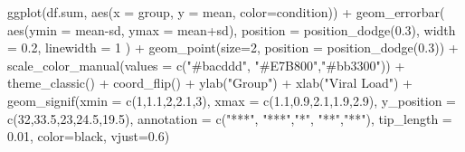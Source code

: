 \documentclass[
  letterpaper,
  DIV=11,
  numbers=noendperiod]{scrreprt}
\newenvironment{Shaded}{\begin{snugshade}}{\end{snugshade}}
\newcommand{\AttributeTok}[1]{\textcolor[rgb]{0.40,0.45,0.13}{#1}}
\newcommand{\DecValTok}[1]{\textcolor[rgb]{0.68,0.00,0.00}{#1}}
\newcommand{\FloatTok}[1]{\textcolor[rgb]{0.68,0.00,0.00}{#1}}
\newcommand{\FunctionTok}[1]{\textcolor[rgb]{0.28,0.35,0.67}{#1}}
\newcommand{\NormalTok}[1]{\textcolor[rgb]{0.00,0.23,0.31}{#1}}
\newcommand{\SpecialCharTok}[1]{\textcolor[rgb]{0.37,0.37,0.37}{#1}}
\newcommand{\StringTok}[1]{\textcolor[rgb]{0.13,0.47,0.30}{#1}}
\begin{document}
\begin{Shaded}
\begin{Highlighting}[]
\FunctionTok{ggplot}\NormalTok{(df.sum, }\FunctionTok{aes}\NormalTok{(}\AttributeTok{x =}\NormalTok{ group, }\AttributeTok{y =}\NormalTok{ mean, }\AttributeTok{color=}\NormalTok{condition)) }\SpecialCharTok{+}
  \FunctionTok{geom\_errorbar}\NormalTok{(}
    \FunctionTok{aes}\NormalTok{(}\AttributeTok{ymin =}\NormalTok{ mean}\SpecialCharTok{{-}}\NormalTok{sd, }
        \AttributeTok{ymax =}\NormalTok{ mean}\SpecialCharTok{+}\NormalTok{sd),}
    \AttributeTok{position =} \FunctionTok{position\_dodge}\NormalTok{(}\FloatTok{0.3}\NormalTok{), }
    \AttributeTok{width =} \FloatTok{0.2}\NormalTok{,}
    \AttributeTok{linewidth =} \DecValTok{1}
\NormalTok{  ) }\SpecialCharTok{+}
  \FunctionTok{geom\_point}\NormalTok{(}\AttributeTok{size=}\DecValTok{2}\NormalTok{,}
             \AttributeTok{position =} \FunctionTok{position\_dodge}\NormalTok{(}\FloatTok{0.3}\NormalTok{)) }\SpecialCharTok{+}
  \FunctionTok{scale\_color\_manual}\NormalTok{(}\AttributeTok{values =} \FunctionTok{c}\NormalTok{(}\StringTok{"\#bacddd"}\NormalTok{, }\StringTok{"\#E7B800"}\NormalTok{,}\StringTok{"\#bb3300"}\NormalTok{)) }\SpecialCharTok{+}
  \FunctionTok{theme\_classic}\NormalTok{() }\SpecialCharTok{+}
  \FunctionTok{coord\_flip}\NormalTok{() }\SpecialCharTok{+}
  \FunctionTok{ylab}\NormalTok{(}\StringTok{"Group"}\NormalTok{) }\SpecialCharTok{+}
  \FunctionTok{xlab}\NormalTok{(}\StringTok{"Viral Load"}\NormalTok{) }\SpecialCharTok{+}
  \FunctionTok{geom\_signif}\NormalTok{(}\AttributeTok{xmin =} \FunctionTok{c}\NormalTok{(}\DecValTok{1}\NormalTok{,}\FloatTok{1.1}\NormalTok{,}\DecValTok{2}\NormalTok{,}\FloatTok{2.1}\NormalTok{,}\DecValTok{3}\NormalTok{),}
              \AttributeTok{xmax =} \FunctionTok{c}\NormalTok{(}\FloatTok{1.1}\NormalTok{,}\FloatTok{0.9}\NormalTok{,}\FloatTok{2.1}\NormalTok{,}\FloatTok{1.9}\NormalTok{,}\FloatTok{2.9}\NormalTok{),}
              \AttributeTok{y\_position =} \FunctionTok{c}\NormalTok{(}\DecValTok{32}\NormalTok{,}\FloatTok{33.5}\NormalTok{,}\DecValTok{23}\NormalTok{,}\FloatTok{24.5}\NormalTok{,}\FloatTok{19.5}\NormalTok{),}
              \AttributeTok{annotation =} \FunctionTok{c}\NormalTok{(}\StringTok{"***"}\NormalTok{, }\StringTok{"***"}\NormalTok{,}\StringTok{"*"}\NormalTok{, }\StringTok{"**"}\NormalTok{,}\StringTok{"**"}\NormalTok{),}
              \AttributeTok{tip\_length =} \FloatTok{0.01}\NormalTok{,}
              \AttributeTok{color=}\StringTok{\textquotesingle{}black\textquotesingle{}}\NormalTok{,}
              \AttributeTok{vjust=}\FloatTok{0.6}\NormalTok{)}
\end{Highlighting}
\end{Shaded}
\end{document}
